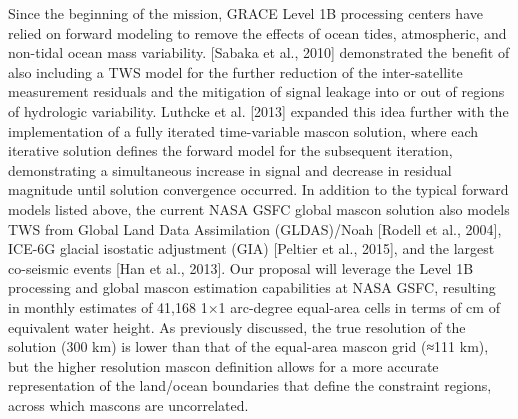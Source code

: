 \documentclass[review,oneside]{igs}
\begin{document}
Since the beginning of the mission, GRACE Level 1B processing centers have relied on forward modeling to remove the effects of ocean tides, atmospheric, and non-tidal ocean mass variability. [Sabaka et al., 2010] demonstrated the benefit of also including a TWS model for the further reduction of the inter-satellite measurement residuals and the mitigation of signal leakage into or out of regions of hydrologic variability. Luthcke et al. [2013] expanded this idea further with the implementation of a fully iterated time-variable mascon solution, where each iterative solution defines the forward model for the subsequent iteration, demonstrating a simultaneous increase in signal and decrease in residual magnitude until solution convergence occurred. In addition to the typical forward models listed above, the current NASA GSFC global mascon solution also models TWS from Global Land Data Assimilation (GLDAS)/Noah [Rodell et al., 2004], ICE-6G glacial isostatic adjustment (GIA) [Peltier et al., 2015], and the largest co-seismic events [Han et al., 2013]. Our proposal will leverage the Level 1B processing and global mascon estimation capabilities at NASA GSFC, resulting in monthly estimates of 41,168 1×1 arc-degree equal-area cells in terms of cm of equivalent water height. As previously discussed, the true resolution of the solution (300 km) is lower than that of the equal-area mascon grid (≈111 km), but the higher resolution mascon definition allows for a more accurate representation of the land/ocean boundaries that define the constraint regions, across which mascons are
uncorrelated.
\end{document}
